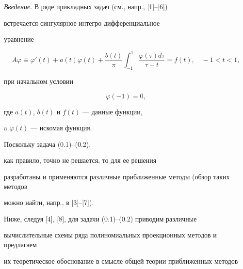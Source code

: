 

\maketitle


\label{begin}








{\it Введение}. В ряде прикладных задач (см., напр., [1]--[6])


встречается сингулярное интегро-дифференциальное


уравнение


\begin{equation}


A\varphi\equiv \varphi'(t)+a(t)\varphi(t)


+\frac{b(t)}{\pi}\int


_{-1}^{1}\frac{\varphi(\tau)d\tau}{\tau-t}=f(t),\quad -1<t<1,


\tag{0.1}


\end{equation}


при начальном условии


\begin{equation}


\varphi(-1)=0,


\tag{0.2}


\end{equation}


где $a(t)$, $b(t)$ и $f(t)$ --- данные функции, 


a $\varphi(t)$ --- искомая функция.





Поскольку задача (0.1)--(0.2), 


как правило, точно не решается, то для ее решения


разработаны и применяются различные приближенные методы (обзор таких методов


можно найти, напр., в [3]--[7]).





Ниже, следуя [4], [8], для задачи (0.1)--(0.2) приводим различные 


вычислительные схемы ряда полиномиальных проекционных методов и предлагаем


их теоретическое обоснование в смысле общей теории приближенных методов 


